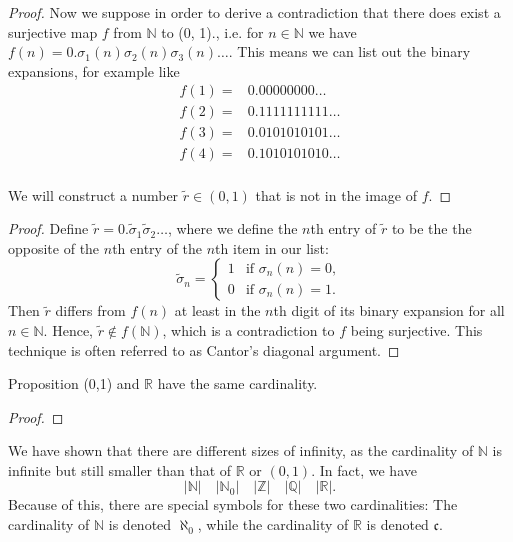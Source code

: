 \documentclass [aspectratio=169]{beamer}
\newcommand{\R}{{\mathbb{R}}}
\newcommand{\Z}{{\mathbb{Z}}}
\newcommand{\N}{{\mathbb{N}}}
\newcommand{\Q}{{\mathbb{Q}}}
\begin{document}
\begin{frame}
\begin{proof}
Now we suppose in order to derive a contradiction that there does exist a surjective map $f$ from $\N$ to (0, 1)., i.e. for $n \in \N$ we have $f(n) = 0.\sigma_1(n)\sigma_2(n)\sigma_3(n)\ldots$. This means we can list out the binary expansions, for example like
\begin{align*}
f(1)= & 0.{0}0000000\ldots \\
f(2)=& 0.1{1}11111111\ldots\\
f(3)=& 0.01{0}1010101\ldots  \\
f(4)= & 0.101{0}101010\ldots  \\
& 
\end{align*}

We will construct a number $\tilde r \in (0,1)$ that is not in the image of $f$. 
\end{proof}
\end{frame}


\begin{frame}
\begin{proof}
Define $\tilde r = 0.\tilde\sigma_1 \tilde\sigma_2 \ldots$, where we define the $n$th entry of $\tilde r$ to be the the opposite of the  $n$th entry of the $n$th item in our list:
\begin{equation*}
    \tilde\sigma_n = \begin{cases} 1 & \text{if } \sigma_n(n) = 0, \\
    0 & \text{if }  \sigma_n(n) = 1.
    \end{cases}
\end{equation*}
Then $\tilde r$ differs from $f(n)$ at least in the $n$th digit of its binary expansion for all $n\in \N$. Hence, $\tilde r\not\in f(\N)$, which is a contradiction to $f$ being surjective. This technique is often referred to as Cantor's diagonal argument. 
\end{proof}
\end{frame}

\begin{frame}
\begin{exampleblock}{Proposition}
(0,1) and $\R$ have the same cardinality. 
\end{exampleblock}
\begin{proof}
\vspace{1.5cm}
\end{proof}

We have shown that there are different sizes of infinity, as the cardinality of $\N$ is infinite but still smaller than that of $\R$ or $(0,1)$. In fact, we have
$$ |\N| \quad |\N_0| \quad  |\Z|  \quad |\Q|  \quad |\R|.$$
Because of this, there are special symbols for these two cardinalities: The cardinality of $\N$ is denoted $\aleph_0$, while the cardinality of $\R$ is denoted $\mathfrak{c}$. 

\end{frame}
\end{document}
